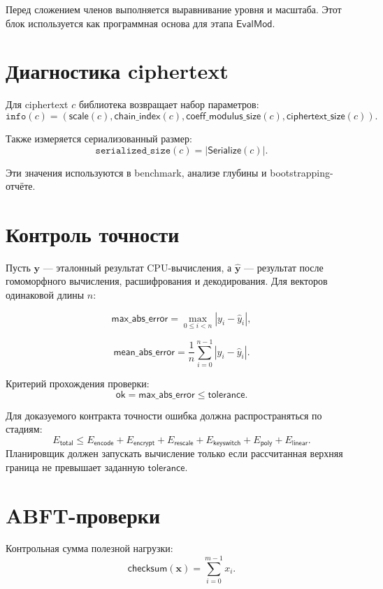 \documentclass[12pt]{article}
\begin{document}
Перед сложением членов выполняется выравнивание уровня и масштаба.
Этот блок используется как программная основа для этапа \(\mathsf{EvalMod}\).

\section*{Диагностика ciphertext}

Для ciphertext \(c\) библиотека возвращает набор параметров:
\[
    \texttt{info}(c) =
    (\mathsf{scale}(c), \mathsf{chain\_index}(c),
    \mathsf{coeff\_modulus\_size}(c), \mathsf{ciphertext\_size}(c)).
\]

Также измеряется сериализованный размер:
\[
    \texttt{serialized\_size}(c) = |\mathsf{Serialize}(c)|.
\]

Эти значения используются в benchmark, анализе глубины и bootstrapping-отчёте.

\section*{Контроль точности}

Пусть \(\mathbf{y}\) --- эталонный результат CPU-вычисления,
а \(\hat{\mathbf{y}}\) --- результат после гомоморфного вычисления,
расшифрования и декодирования. Для векторов одинаковой длины \(n\):

\[
    \mathsf{max\_abs\_error}
    =
    \max_{0 \leq i < n}|y_i - \hat{y}_i|,
\]

\[
    \mathsf{mean\_abs\_error}
    =
    \frac{1}{n}\sum_{i=0}^{n-1}|y_i - \hat{y}_i|.
\]

Критерий прохождения проверки:
\[
    \mathsf{ok}
    =
    \mathsf{max\_abs\_error} \leq \mathsf{tolerance}.
\]

Для доказуемого контракта точности ошибка должна распространяться
по стадиям:
\[
    E_{\mathsf{total}}
    \leq
    E_{\mathsf{encode}}
    +
    E_{\mathsf{encrypt}}
    +
    E_{\mathsf{rescale}}
    +
    E_{\mathsf{keyswitch}}
    +
    E_{\mathsf{poly}}
    +
    E_{\mathsf{linear}}.
\]
Планировщик должен запускать вычисление только если рассчитанная
верхняя граница не превышает заданную \(\mathsf{tolerance}\).

\section*{ABFT-проверки}

Контрольная сумма полезной нагрузки:
\[
    \mathsf{checksum}(\mathbf{x})
    =
    \sum_{i=0}^{m-1}x_i.
\]
\end{document}
